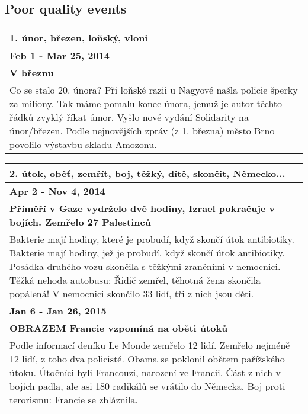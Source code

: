 \hspace{\fill}

\subsection*{Poor quality events}
\begin{tabularx}{\linewidth}{p{\linewidth}} \toprule[1.5pt]

\bf 1. únor, březen, loňský, vloni \\ \midrule
\bf Feb 1 - Mar 25, 2014 \\ \midrule
\bf V březnu \\
Co se stalo 20. února? Při loňské razii u Nagyové našla policie šperky za miliony. Tak máme pomalu konec února, jemuž je autor těchto řádků zvyklý říkat úmor. Vyšlo nové vydání Solidarity na únor/březen. Podle nejnovějších zpráv (z 1. března) město Brno povolilo výstavbu skladu Amozonu. \\ \bottomrule[1.25pt]
\end{tabularx}

\hspace{\fill}

\begin{tabularx}{\linewidth}{p{\linewidth}} \toprule[1.5pt]
\bf 2. útok, oběť, zemřít, boj, těžký, dítě, skončit, Německo... \\ \midrule
\bf Apr 2 - Nov 4, 2014 \\ \midrule
\bf Příměří v Gaze vydrželo dvě hodiny, Izrael pokračuje v bojích. Zemřelo 27 Palestinců \\
Bakterie mají hodiny, které je probudí, když skončí útok antibiotiky. Bakterie mají hodiny, jež je probudí, když skončí útok antibiotiky. Posádka druhého vozu skončila s těžkými zraněními v nemocnici. Těžká nehoda autobusu: Řidič zemřel, těhotná žena skončila popálená! V nemocnici skončilo 33 lidí, tři z nich jsou děti. \\ \bottomrule[1.25pt]

\bf Jan 6 - Jan 26, 2015 \\ \midrule
\bf OBRAZEM Francie vzpomíná na oběti útoků \\
Podle informací deníku Le Monde zemřelo 12 lidí. Zemřelo nejméně 12 lidí, z toho dva policisté. Obama se poklonil obětem pařížského útoku. Útočníci byli Francouzi, narození ve Francii. Část z nich v bojích padla, ale asi 180 radikálů se vrátilo do Německa. Boj proti terorismu: Francie se zbláznila. \\ \bottomrule[1.25pt]

\end{tabularx}
\hspace{\fill}


